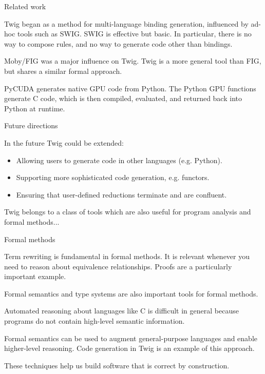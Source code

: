 \documentclass{beamer}
\begin{document}
\begin{frame}{Related work}

Twig began as a method for multi-language binding generation, influenced by
ad-hoc tools such as SWIG. SWIG is effective but basic. In particular, there
is no way to compose rules, and no way to generate code other than bindings.

Moby/FIG was a major influence on Twig. Twig is a more general tool than FIG,
but shares a similar formal approach.

PyCUDA generates native GPU code from Python. The Python GPU functions
generate C code, which is then compiled, evaluated, and returned back into
Python at runtime.

\end{frame}


\begin{frame}{Future directions}

In the future Twig could be extended:

\begin{itemize}

\item Allowing users to generate code in other languages (e.g. Python).

\item Supporting more sophisticated code generation, e.g. functors.

\item Ensuring that user-defined reductions terminate and are confluent.

\end{itemize}

Twig belongs to a class of tools which are also useful for program analysis
and formal methods...

\end{frame}


\begin{frame}{Formal methods}

Term rewriting is fundamental in formal methods. It is relevant whenever you
need to reason about equivalence relationships. Proofs are a particularly
important example.

Formal semantics and type systems are also important tools for formal methods.

Automated reasoning about languages like C is difficult in general because
programs do not contain high-level semantic information.

Formal semantics can be used to augment general-purpose languages and enable
higher-level reasoning. Code generation in Twig is an example of this
approach.

These techniques help us build software that is correct by construction.

\end{frame}
\end{document}
